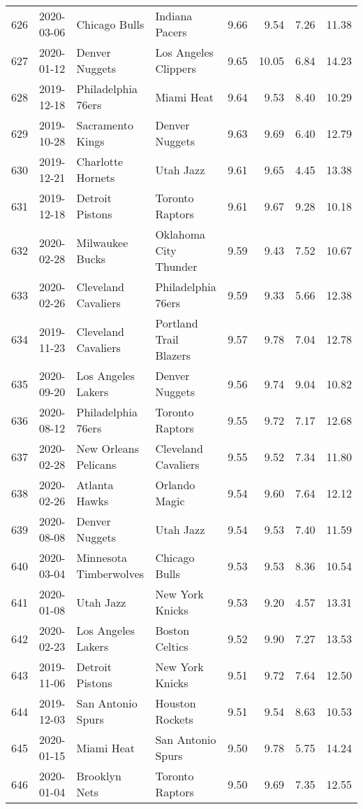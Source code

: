 \documentclass[
  11pt,
]{article}
\theoremstyle{nonumberplain}
\begin{document}
\begin{longtable}{rl|llr|rrr}
626 & 2020-03-06 & Chicago Bulls & Indiana Pacers & 9.66 & 9.54 & 7.26 & 11.38\\
627 & 2020-01-12 & Denver Nuggets & Los Angeles Clippers & 9.65 & 10.05 & 6.84 & 14.23\\
628 & 2019-12-18 & Philadelphia 76ers & Miami Heat & 9.64 & 9.53 & 8.40 & 10.29\\
629 & 2019-10-28 & Sacramento Kings & Denver Nuggets & 9.63 & 9.69 & 6.40 & 12.79\\
630 & 2019-12-21 & Charlotte Hornets & Utah Jazz & 9.61 & 9.65 & 4.45 & 13.38\\
631 & 2019-12-18 & Detroit Pistons & Toronto Raptors & 9.61 & 9.67 & 9.28 & 10.18\\
632 & 2020-02-28 & Milwaukee Bucks & Oklahoma City Thunder & 9.59 & 9.43 & 7.52 & 10.67\\
633 & 2020-02-26 & Cleveland Cavaliers & Philadelphia 76ers & 9.59 & 9.33 & 5.66 & 12.38\\
634 & 2019-11-23 & Cleveland Cavaliers & Portland Trail Blazers & 9.57 & 9.78 & 7.04 & 12.78\\
635 & 2020-09-20 & Los Angeles Lakers & Denver Nuggets & 9.56 & 9.74 & 9.04 & 10.82\\
636 & 2020-08-12 & Philadelphia 76ers & Toronto Raptors & 9.55 & 9.72 & 7.17 & 12.68\\
637 & 2020-02-28 & New Orleans Pelicans & Cleveland Cavaliers & 9.55 & 9.52 & 7.34 & 11.80\\
638 & 2020-02-26 & Atlanta Hawks & Orlando Magic & 9.54 & 9.60 & 7.64 & 12.12\\
639 & 2020-08-08 & Denver Nuggets & Utah Jazz & 9.54 & 9.53 & 7.40 & 11.59\\
640 & 2020-03-04 & Minnesota Timberwolves & Chicago Bulls & 9.53 & 9.53 & 8.36 & 10.54\\
641 & 2020-01-08 & Utah Jazz & New York Knicks & 9.53 & 9.20 & 4.57 & 13.31\\
642 & 2020-02-23 & Los Angeles Lakers & Boston Celtics & 9.52 & 9.90 & 7.27 & 13.53\\
643 & 2019-11-06 & Detroit Pistons & New York Knicks & 9.51 & 9.72 & 7.64 & 12.50\\
644 & 2019-12-03 & San Antonio Spurs & Houston Rockets & 9.51 & 9.54 & 8.63 & 10.53\\
645 & 2020-01-15 & Miami Heat & San Antonio Spurs & 9.50 & 9.78 & 5.75 & 14.24\\
646 & 2020-01-04 & Brooklyn Nets & Toronto Raptors & 9.50 & 9.69 & 7.35 & 12.55\\

\end{longtable}
\end{document}
